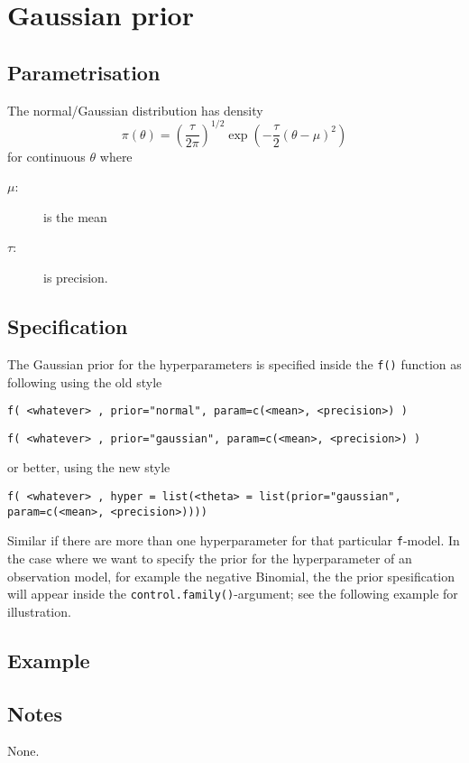 \documentclass[a4paper,11pt]{article}
\begin{document}
\section*{Gaussian prior}

\subsection*{Parametrisation}
The normal/Gaussian distribution has density
\begin{equation}
    \pi(\theta)=\left(\frac{\tau}{2\pi}\right)^{1/2}
    \exp\left(-\frac{\tau}{2}(\theta-\mu)^2\right)
\end{equation}
for continuous $\theta$ where
\begin{description}
\item[$\mu$:] is the mean
\item[$\tau$:] is precision.
\end{description}

\subsection*{Specification}
The Gaussian prior for the hyperparameters is specified inside the
\texttt{f()} function as following using the old style
\begin{center}
    \texttt{f( <whatever> , prior="normal", param=c(<mean>, <precision>) )}
\end{center}
\begin{center}
    \texttt{f( <whatever> , prior="gaussian", param=c(<mean>, <precision>) )}
\end{center}
or better, using the new style
\begin{center}
    \texttt{f( <whatever> , hyper = list(<theta> = list(prior="gaussian", param=c(<mean>, <precision>))))}
\end{center}
Similar if there are more than one hyperparameter for that particular
\texttt{f}-model. In the case where we want to specify the prior for
the hyperparameter of an observation model, for example the negative
Binomial, the the prior spesification will appear inside the
\texttt{control.family()}-argument; see the following example for
illustration.

\subsection*{Example}


\subsection*{Notes}

None.
\end{document}
